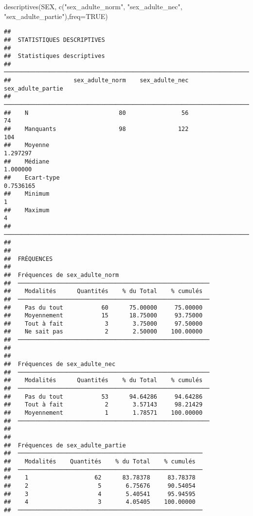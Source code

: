 \documentclass[
]{article}
\newenvironment{Shaded}{\begin{snugshade}}{\end{snugshade}}
\newcommand{\AttributeTok}[1]{\textcolor[rgb]{0.77,0.63,0.00}{#1}}
\newcommand{\ConstantTok}[1]{\textcolor[rgb]{0.00,0.00,0.00}{#1}}
\newcommand{\FunctionTok}[1]{\textcolor[rgb]{0.00,0.00,0.00}{#1}}
\newcommand{\NormalTok}[1]{#1}
\newcommand{\StringTok}[1]{\textcolor[rgb]{0.31,0.60,0.02}{#1}}
\begin{document}
\begin{Shaded}
\begin{Highlighting}[]
\FunctionTok{descriptives}\NormalTok{(SEX, }\FunctionTok{c}\NormalTok{(}\StringTok{"sex\_adulte\_norm"}\NormalTok{, }\StringTok{"sex\_adulte\_nec"}\NormalTok{, }\StringTok{"sex\_adulte\_partie"}\NormalTok{),}\AttributeTok{freq=}\ConstantTok{TRUE}\NormalTok{)}
\end{Highlighting}
\end{Shaded}

\begin{verbatim}
## 
##  STATISTIQUES DESCRIPTIVES
## 
##  Statistiques descriptives                                                
##  ──────────────────────────────────────────────────────────────────────── 
##                  sex_adulte_norm    sex_adulte_nec    sex_adulte_partie   
##  ──────────────────────────────────────────────────────────────────────── 
##    N                          80                56                   74   
##    Manquants                  98               122                  104   
##    Moyenne                                                     1.297297   
##    Médiane                                                     1.000000   
##    Ecart-type                                                 0.7536165   
##    Minimum                                                            1   
##    Maximum                                                            4   
##  ──────────────────────────────────────────────────────────────────────── 
## 
## 
##  FRÉQUENCES
## 
##  Fréquences de sex_adulte_norm                           
##  ─────────────────────────────────────────────────────── 
##    Modalités      Quantités    % du Total    % cumulés   
##  ─────────────────────────────────────────────────────── 
##    Pas du tout           60      75.00000     75.00000   
##    Moyennement           15      18.75000     93.75000   
##    Tout à fait            3       3.75000     97.50000   
##    Ne sait pas            2       2.50000    100.00000   
##  ─────────────────────────────────────────────────────── 
## 
## 
##  Fréquences de sex_adulte_nec                            
##  ─────────────────────────────────────────────────────── 
##    Modalités      Quantités    % du Total    % cumulés   
##  ─────────────────────────────────────────────────────── 
##    Pas du tout           53      94.64286     94.64286   
##    Tout à fait            2       3.57143     98.21429   
##    Moyennement            1       1.78571    100.00000   
##  ─────────────────────────────────────────────────────── 
## 
## 
##  Fréquences de sex_adulte_partie                       
##  ───────────────────────────────────────────────────── 
##    Modalités    Quantités    % du Total    % cumulés   
##  ───────────────────────────────────────────────────── 
##    1                   62      83.78378     83.78378   
##    2                    5       6.75676     90.54054   
##    3                    4       5.40541     95.94595   
##    4                    3       4.05405    100.00000   
##  ─────────────────────────────────────────────────────
\end{verbatim}
\end{document}

